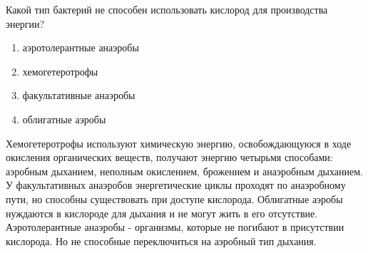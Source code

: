 
Какой тип бактерий не способен использовать кислород для производства энергии?

\begin{enumerate}
    \item аэротолерантные анаэробы
    \item хемогетеротрофы
    \item факультативные анаэробы
    \item облигатные аэробы
\end{enumerate}

\explanationSection

Хемогетеротрофы используют химическую энергию, освобождающуюся в ходе окисления органических веществ, получают энергию четырьмя способами: аэробным дыханием, неполным окислением, брожением и анаэробным дыханием. У факультативных анаэробов энергетические циклы проходят по анаэробному пути, но способны существовать при доступе кислорода. Облигатные аэробы нуждаются в кислороде для дыхания и не могут жить в его отсутствие. Аэротолерантные анаэробы - организмы, которые не погибают в присутствии кислорода. Но не способные переключиться на аэробный тип дыхания.  

